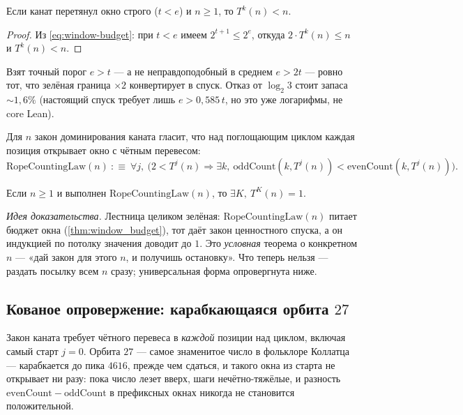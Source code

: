 \begin{theorem}\label{thm:window_descends}
Если канат перетянул окно строго ($t<e$) и $n\ge 1$, то $T^{k}(n)<n$. \green{}
\end{theorem}

\begin{proof}
Из \cref{eq:window-budget}: при $t<e$ имеем $2^{t+1}\le 2^{e}$, откуда $2\cdot T^{k}(n)\le n$ и
$T^{k}(n)<n$.
\end{proof}

Взят точный порог $e>t$ --- а не неправдоподобный в среднем $e>2t$ --- ровно тот, что зелёная граница
$\times 2$ конвертирует в спуск. Отказ от $\log_2 3$ стоит запаса $\sim 1{,}6\%$ (настоящий спуск
требует лишь $e>0{,}585\,t$, но это уже логарифмы, не core Lean).

\begin{definition}\label{def:ropeCountingLaw}
Для $n$ закон доминирования каната гласит, что над поглощающим циклом каждая позиция открывает окно с
чётным перевесом:
\begin{equation}\label{eq:rope-law}
\mathrm{RopeCountingLaw}(n)\ :\equiv\ \forall j,\ \bigl(2<T^{j}(n)\Rightarrow \exists k,\ \mathrm{oddCount}(k,T^{j}(n))<\mathrm{evenCount}(k,T^{j}(n))\bigr).
\end{equation}
\end{definition}

\begin{theorem}\label{thm:reaches_one_of_countingLaw}
Если $n\ge 1$ и выполнен $\mathrm{RopeCountingLaw}(n)$, то $\exists K,\ T^{K}(n)=1$. \green{}
\end{theorem}

\emph{Идея доказательства.} Лестница целиком зелёная: $\mathrm{RopeCountingLaw}(n)$ питает бюджет окна
(\cref{thm:window_budget}), тот даёт закон ценностного спуска, а он индукцией по потолку значения
доводит до $1$. Это \emph{условная} теорема о конкретном $n$ --- «дай закон для этого $n$, и получишь
остановку». Что теперь нельзя --- раздать посылку всем $n$ сразу; универсальная форма опровергнута ниже.

\subsection{Кованое опровержение: карабкающаяся орбита $27$}

Закон каната требует чётного перевеса в \emph{каждой} позиции над циклом, включая самый старт $j=0$.
Орбита $27$ --- самое знаменитое число в фольклоре Коллатца --- карабкается до пика $4616$, прежде чем
сдаться, и такого окна из старта не открывает ни разу: пока число лезет вверх, шаги нечётно-тяжёлые, и
разность $\mathrm{evenCount}-\mathrm{oddCount}$ в префиксных окнах никогда не становится положительной.

